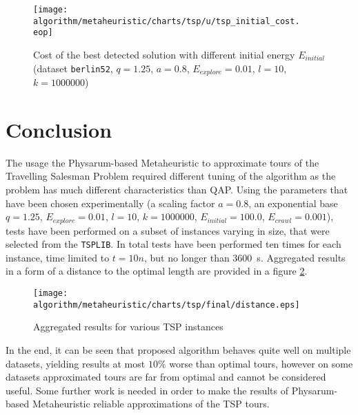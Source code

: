 \begin{figure}
  \centering

  \texttt{[image: algorithm/metaheuristic/charts/tsp/u/tsp\_initial\_cost.\\eop]}

  \caption{Cost of the best detected solution with different initial energy $E_{initial}$ (dataset \texttt{berlin52}, $q=1.25$, $a=0.8$, $E_{explore}=0.01$, $l=10$, $k=1000000$)}
  \label{figure:tsp_initial_cost}
\end{figure}

\section*{Conclusion}

The usage the Physarum-based Metaheuristic to approximate tours of the Travelling Salesman Problem required different tuning of the algorithm as the problem has much different characteristics than QAP. Using the parameters that have been chosen experimentally (a scaling factor $a=0.8$, an exponential base $q=1.25$, $E_{explore}=0.01$, $l=10$, $k=1000000$, $E_{initial}=100.0$, $E_{crawl}=0.001$), tests have been performed on a subset of instances varying in size, that were selected from the \texttt{TSPLIB}. In total tests have been performed ten times for each instance, time limited to $t=10n$, but no longer than 3600~s. Aggregated results in a form of a distance to the optimal length are provided in a figure \ref{figure:tsp_final}.

\begin{figure}
  \centering

  \texttt{[image: algorithm/metaheuristic/charts/tsp/final/distance.eps]}

  \caption{Aggregated results for various TSP instances}
  \label{figure:tsp_final}
\end{figure}

In the end, it can be seen that proposed algorithm behaves quite well on multiple datasets, yielding results at most $10\%$ worse than optimal tours, however on some datasets approximated tours are far from optimal and cannot be considered useful. Some further work is needed in order to make the results of Physarum-based Metaheuristic reliable approximations of the TSP tours.
